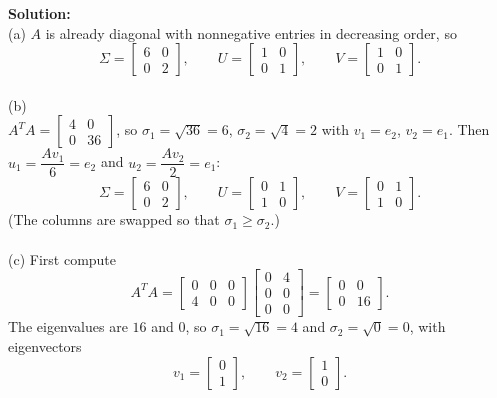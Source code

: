 \documentclass[11pt]{article}
\begin{document}
\textbf{Solution:}\\
(a) $A$ is already diagonal with nonnegative entries in decreasing order, so
$$
\Sigma = \begin{bmatrix} 6 & 0 \\ 0 & 2 \end{bmatrix}, \qquad
U = \begin{bmatrix} 1 & 0 \\ 0 & 1 \end{bmatrix}, \qquad
V = \begin{bmatrix} 1 & 0 \\ 0 & 1 \end{bmatrix}.
$$\\
(b)\\
$A^TA = \begin{bmatrix} 4 & 0 \\ 0 & 36 \end{bmatrix}$, so $\sigma_1 = \sqrt{36} = 6$,
$\sigma_2 = \sqrt{4} = 2$ with $v_1 = e_2$, $v_2 = e_1$. Then $u_1 = \dfrac{Av_1}{6} = e_2$ and
$u_2 = \dfrac{Av_2}{2} = e_1$:
$$
\Sigma = \begin{bmatrix} 6 & 0 \\ 0 & 2 \end{bmatrix}, \qquad
U = \begin{bmatrix} 0 & 1 \\ 1 & 0 \end{bmatrix}, \qquad
V = \begin{bmatrix} 0 & 1 \\ 1 & 0 \end{bmatrix}.
$$
(The columns are swapped so that $\sigma_1 \ge \sigma_2$.)\\
\\
(c)
First compute
$$
A^TA = \begin{bmatrix} 0 & 0 & 0 \\ 4 & 0 & 0 \end{bmatrix}
\begin{bmatrix} 0 & 4 \\ 0 & 0 \\ 0 & 0 \end{bmatrix}
= \begin{bmatrix} 0 & 0 \\ 0 & 16 \end{bmatrix}.
$$
The eigenvalues are $16$ and $0$, so $\sigma_1 = \sqrt{16} = 4$ and $\sigma_2 = \sqrt{0} = 0$,
with eigenvectors
$$
v_1 = \begin{bmatrix} 0 \\ 1 \end{bmatrix}, \qquad
v_2 = \begin{bmatrix} 1 \\ 0 \end{bmatrix}.
$$
\end{document}
